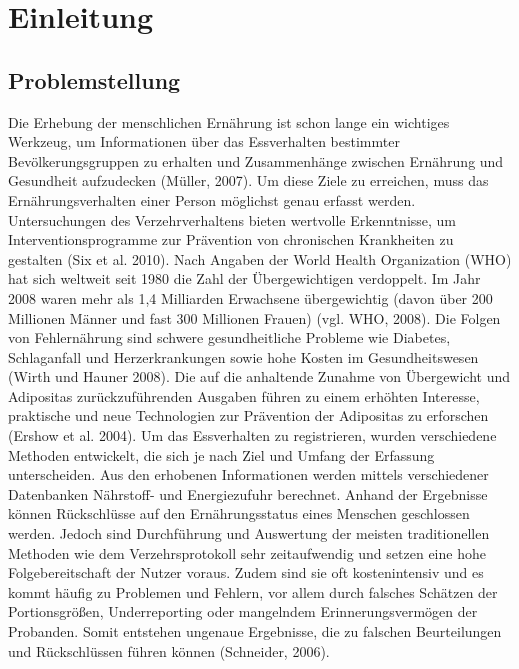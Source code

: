
\section{Einleitung}

\subsection{Problemstellung}
Die Erhebung der menschlichen  Ernährung ist schon lange ein wichtiges Werkzeug, um Informationen über das Essverhalten bestimmter Bevölkerungsgruppen zu erhalten und Zusammenhänge zwischen Ernährung und Gesundheit aufzudecken (Müller, 2007).
Um diese Ziele zu erreichen, muss das Ernährungsverhalten einer Person möglichst genau erfasst werden. Untersuchungen des Verzehrverhaltens bieten wertvolle Erkenntnisse, um Interventionsprogramme zur Prävention von chronischen Krankheiten zu gestalten (Six et al. 2010). Nach  Angaben der World Health Organization (WHO) hat sich weltweit seit 1980 die Zahl der Übergewichtigen verdoppelt. Im Jahr 2008 waren mehr als 1,4 Milliarden Erwachsene übergewichtig (davon über 200 Millionen Männer und fast 300 Millionen Frauen) (vgl. WHO, 2008). Die Folgen von Fehlernährung sind schwere gesundheitliche Probleme wie Diabetes, Schlaganfall und Herzerkrankungen sowie hohe Kosten im Gesundheitswesen (Wirth und Hauner 2008). Die auf die anhaltende Zunahme von Übergewicht und Adipositas zurückzuführenden Ausgaben führen zu einem erhöhten Interesse, praktische und neue Technologien zur Prävention der Adipositas zu erforschen (Ershow et al. 2004). Um das Essverhalten zu registrieren, wurden verschiedene Methoden entwickelt, die sich je nach Ziel und Umfang der Erfassung unterscheiden. Aus den erhobenen Informationen werden mittels verschiedener Datenbanken Nährstoff- und Energiezufuhr berechnet. Anhand der Ergebnisse können Rückschlüsse auf den Ernährungsstatus eines Menschen geschlossen werden. Jedoch sind Durchführung und Auswertung der meisten traditionellen Methoden wie dem Verzehrsprotokoll sehr zeitaufwendig und setzen eine hohe Folgebereitschaft der Nutzer voraus. Zudem sind sie oft kostenintensiv und es kommt häufig zu Problemen und Fehlern, vor allem durch falsches Schätzen der Portionsgrößen, Underreporting oder mangelndem Erinnerungsvermögen der Probanden. Somit entstehen ungenaue Ergebnisse, die zu falschen Beurteilungen und Rückschlüssen führen können (Schneider, 2006).


